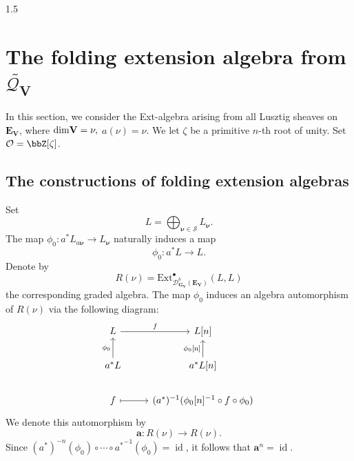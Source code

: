 \documentclass[10pt]{amsart}
\def\dim{\mbox{\rm dim}}   \def\End{\mbox{\rm End}}
\def\bfV{{\mathbf V}}
\def\bfV{\mathbf{V}}
\newcommand\mo{{\mathcal{O}}}
\newcommand\mq{{\mathcal{Q}}}
\begin{document}
\begin{spacing}{1.5}
\section{The folding extension algebra from $\widetilde{\mq_{\bfV}}$}
In this section, we consider the Ext-algebra arising from all Lusztig sheaves on $\mathbf{E}_{\mathbf{V}}$, where $\dim \mathbf{V} = \nu,$ $a(\nu)=\nu.$ We let $\zeta$ be a primitive $n$-th root of unity. Set $\mo=\bbZ[\zeta]$.
\subsection{The constructions of folding extension algebras}

Set
\[
L = \bigoplus_{\boldsymbol{\nu}\in \mathcal{S}} L_{\boldsymbol{\nu}}.
\]
The map $\phi_0 : a^* L_{a\boldsymbol{\nu}} \to L_{\boldsymbol{\nu}}$ naturally induces a map
\[
\phi_0 : a^* L \to L.
\]
Denote by
\[
R(\nu) = \mathrm{Ext}^{\bullet}_{\mathcal{D}^{b}_{\mathbf{G}_{\mathbf{V}}}(\mathbf{E}_{\mathbf{V}})}(L, L)
\]
the corresponding graded algebra. The map $\phi_0$ induces an algebra automorphism of $R(\nu)$ via the following diagram:
\[
\begin{tikzcd}
L \arrow[r, "f"] & L[n] \\
a^* L \arrow[u, "\phi_0"] & a^* L[n] \arrow[u, "\phi_0\text{[n]}"] \\
f \arrow[r, maps to] & (a^*)^{-1}(\phi_0[n]^{-1} \circ f \circ \phi_0)
\end{tikzcd}
\]
We denote this automorphism by
\[
\mathbf{a} : R(\nu) \to R(\nu).
\]
Since $(a^*)^{-n}(\phi_0) \circ \cdots \circ {a^*}^{-1}(\phi_0) = \operatorname{id}$, it follows that $\mathbf{a}^n = \operatorname{id}$.


\end{spacing}
\end{document}
